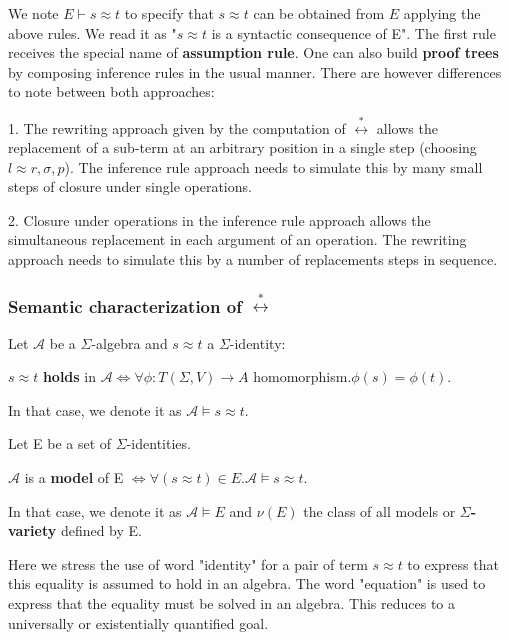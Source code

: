 We note $E \vdash s \approx t$ to specify that $s \approx t$ can be obtained from $E$ applying the above rules. We read it as "$s \approx t$ is a syntactic consequence of E". The first rule receives the special name of \textbf{assumption rule}. One can also build \textbf{proof trees} by composing inference rules in the usual manner. There are however differences to note between both approaches:

1. The rewriting approach given by the computation of $\stackrel{*}{\leftrightarrow}$ allows the replacement of a sub-term at an arbitrary position in a single step (choosing $l \approx r,\sigma,p$). The inference rule approach needs to simulate this by many small steps of closure under single operations. 

2. Closure under operations in the inference rule approach allows the simultaneous replacement in each argument of an operation. The rewriting approach needs to simulate this by a number of replacements steps in sequence. 

\subsubsection{Semantic characterization of $\stackrel{*}{\leftrightarrow}$}

\begin{definition}
Let $\mathcal{A}$ be a $\Sigma$-algebra  and $s \approx t$ a $\Sigma$-identity:

$s \approx t$ \textbf{holds} in $\mathcal{A} \iff \forall \phi:T(\Sigma,V) \to A$ homomorphism.$\phi(s) = \phi(t)$.

In that case, we denote it as $\mathcal{A} \models s \approx t$.

Let E be a set of $\Sigma$-identities. 

$\mathcal{A}$ is a \textbf{model} of E $\iff \forall (s \approx t) \in E. \mathcal{A} \models s \approx t$. 

In that case, we denote it as $\mathcal{A} \models E$ and $\nu(E)$ the class of all models or  \textbf{$\Sigma$-variety} defined by E.
\end{definition}

Here we stress the use of word "identity" for a pair of term $s \approx t$ to express that this equality is assumed to hold in an algebra. The word "equation" is used to express that the equality must be solved in an algebra. This reduces to a universally or existentially quantified goal. 


